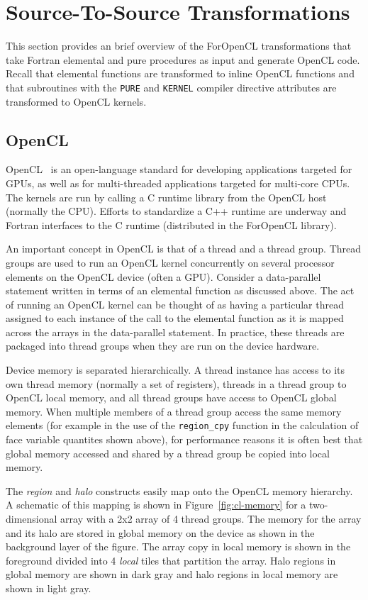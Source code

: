 \section{Source-To-Source Transformations}

This section provides an brief overview of the ForOpenCL transformations that take
Fortran elemental and pure procedures as input and generate OpenCL code.  Recall
that elemental functions are transformed to inline OpenCL functions and that
subroutines with the {\tt PURE} and {\tt KERNEL} compiler directive attributes
are transformed to OpenCL kernels.

\subsection{OpenCL}

OpenCL~\cite{opencl08} is an open-language standard for developing applications
targeted for GPUs, as well as for multi-threaded applications targeted for
multi-core CPUs.  The kernels are run by calling a C runtime library from the
OpenCL host (normally the CPU).  Efforts to standardize a C++ runtime are
underway and Fortran interfaces to the C runtime (distributed in the ForOpenCL
library).

An important concept in OpenCL is that of a thread and a thread group.  Thread
groups are used to run an OpenCL kernel concurrently on several processor
elements on the OpenCL device (often a GPU).  Consider a data-parallel statement
written in terms of an elemental function as discussed above.  The act of
running an OpenCL kernel can be thought of as having a particular thread
assigned to each instance of the call to the elemental function as it is mapped
across the arrays in the data-parallel statement.  In practice, these threads
are packaged into thread groups when they are run on the device hardware.

Device memory is separated hierarchically.  A thread instance has access to its
own thread memory (normally a set of registers), threads in a thread group to
OpenCL local memory, and all thread groups have access to OpenCL global memory.
When multiple members of a thread group access the same memory elements (for
example in the use of the {\tt region\_cpy} function in the calculation of face
variable quantites shown above), for performance reasons it is often best that
global memory accessed and shared by a thread group be copied into local memory.

The \emph{region} and \emph{halo} constructs easily map onto the OpenCL memory
hierarchy.  A schematic of this mapping is shown in Figure~\ref{fig:cl-memory}
for a two-dimensional array with a 2x2 array of 4 thread groups.  The memory
for the array and its halo are stored in global memory on the device as shown
in the background layer of the figure.  The array copy in local memory is
shown in the foreground divided into 4 \emph{local} tiles that partition the
array.  Halo regions in global memory are shown in dark gray and halo regions
in local memory are shown in light gray.

